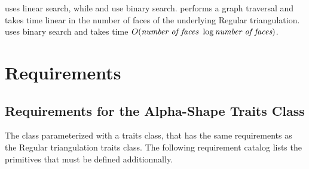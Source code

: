  uses linear search, while 
 and  
use binary search.
 performs a graph traversal and takes time linear in the number of faces of the underlying Regular triangulation.
 uses binary search and takes time
$O(\mbox{\em number of faces } \log{\mbox{\em number of faces}})$.


\section{Requirements\label{I2_SectRequirements}}


\subsection{Requirements for the Alpha-Shape Traits Class} 

The class  parameterized with a
traits class, that has the same requirements as the Regular
triangulation traits class.  The following requirement catalog lists
the primitives that must be defined additionnally.

